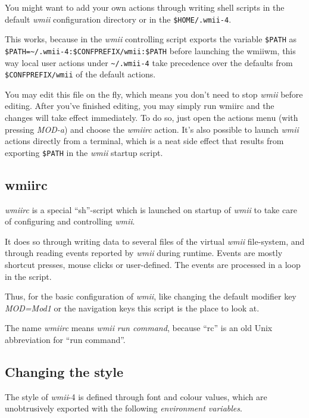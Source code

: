 \documentclass[12pt,a4paper]{article} %
\newcommand{\wmii}{\emph{wmii}}
\begin{document}
    You might want to add your own actions through writing shell scripts in the
    default \wmii{} configuration directory or in the \texttt{\$HOME/.wmii-4}.
    
    This works, because in the \wmii{} controlling script exports the variable
    \verb+$PATH+ as\\ \verb+$PATH=~/.wmii-4:$CONFPREFIX/wmii:$PATH+ before
    launching the wmiiwm, this way local user actions under
    \verb+~/.wmii-4+ take precedence over the defaults from
    \verb+$CONFPREFIX/wmii+ of the default actions.
    
    You may edit this file on the fly, which means you don't need to
    stop \wmii{} before editing. After you've finished editing, you may
    simply run wmiirc and the changes will take effect immediately.
    To do so, just open the actions menu (with pressing \emph{MOD-a}) and
    choose the \emph{wmiirc} action. It's also possible to launch \wmii{} actions
    directly from a terminal, which is a neat side effect that results from
    exporting \verb+$PATH+ in the \wmii{} startup script.

    \subsection{wmiirc}
    
    \emph{wmiirc} is a special ``sh''-script which is launched on startup
    of \wmii{} to take care of configuring and controlling \wmii.

    It does so through writing data to several files of the virtual \wmii
    file-system, and through reading events reported by \wmii{} during runtime.
    Events are mostly shortcut presses, mouse clicks or user-defined.
    The events are processed in a loop in the script.
    
    Thus, for the basic configuration of \wmii, like changing the default
    modifier key \emph{MOD=Mod1} or the navigation keys this script is
    the place to look at.

    The name \emph{wmiirc} means \wmii{} \emph{run command}, because ``rc'' is an
    old Unix abbreviation for ``run command''.

    \subsection{Changing the style}

    The style of \wmii-4 is defined through font and colour values, which are
    unobtrusively exported with the following \emph{environment variables}.
\end{document}
